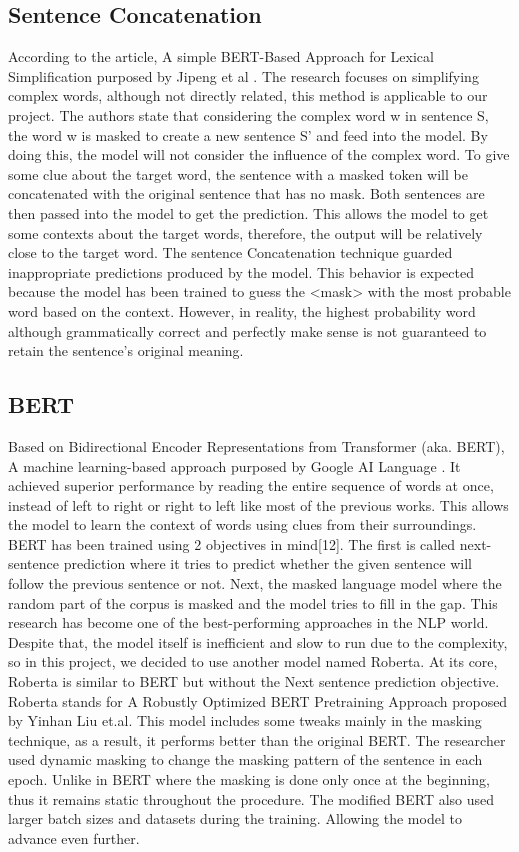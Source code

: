 \documentclass[12pt,oneside,openright,a4paper]{cpe-english-project}
\begin{document}
\subsection{Sentence Concatenation}
According to the article, A simple BERT-Based Approach for Lexical Simplification purposed by Jipeng et al \cite{l}. The research focuses on simplifying complex words, although not directly related, this method is applicable to our project. The authors state that considering the complex word w in sentence S, the word w is masked to create a new sentence S’ and feed into the model. By doing this, the model will not consider the influence of the complex word. To give some clue about the target word, the sentence with a masked token will be concatenated with the original sentence that has no mask. Both sentences are then passed into the model to get the prediction. This allows the model to get some contexts about the target words, therefore, the output will be relatively close to the target word. The sentence Concatenation technique guarded inappropriate predictions produced by the model. This behavior is expected because the model has been trained to guess the <mask> with the most probable word based on the context. However, in reality, the highest probability word although grammatically correct and perfectly make sense is not guaranteed to retain the sentence’s original meaning. 

\subsection{BERT}
Based on Bidirectional Encoder Representations from Transformer (aka. BERT), A machine learning-based approach purposed by Google AI Language \cite{d}. It achieved superior performance by reading the entire sequence of words at once, instead of left to right or right to left like most of the previous works. This allows the model to learn the context of words using clues from their surroundings. BERT has been trained using 2 objectives in mind[12]. The first is called next-sentence prediction where it tries to predict whether the given sentence will follow the previous sentence or not. Next, the masked language model where the random part of the corpus is masked and the model tries to fill in the gap. This research has become one of the best-performing approaches in the NLP world. Despite that, the model itself is inefficient and slow to run due to the complexity, so in this project, we decided to use another model named Roberta. At its core, Roberta is similar to BERT but without the Next sentence prediction objective.
Roberta stands for A Robustly Optimized BERT Pretraining Approach proposed by Yinhan Liu et.al. This model includes some tweaks mainly in the masking technique, as a result, it performs better than the original BERT. The researcher used dynamic masking to change the masking pattern of the sentence in each epoch. Unlike in BERT where the masking is done only once at the beginning, thus it remains static throughout the procedure. The modified BERT also used larger batch sizes and datasets during the training. Allowing the model to advance even further. 
\end{document}
